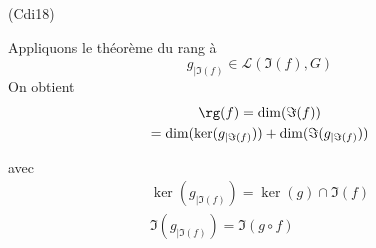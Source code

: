 \begin{tiny}(Cdi18)\end{tiny} Appliquons le théorème du rang à
\begin{displaymath}
  g_{|\Im(f)} \in \mathcal{L}(\Im(f),G)
\end{displaymath}
On obtient
\begin{multline*}
  \rg(f) = \dim(\Im(f)) \\
  = \dim(\ker(g_{|\Im(f)})) + \dim(\Im(g_{|\Im(f)})) 
\end{multline*}

avec
\begin{multline*}
  \ker(g_{|\Im(f)}) = \ker(g) \cap \Im(f) \\ 
  \Im(g_{|\Im(f)}) = \Im(g\circ f)
\end{multline*}


